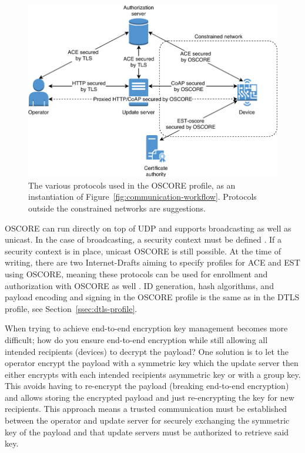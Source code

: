 \documentclass[0-thesis.tex]{subfiles}
\begin{document}
\begin{figure}
    \caption{The various protocols used in the OSCORE profile, as an instantiation of
    Figure~\ref{fig:communication-workflow}. Protocols outside the constrained networks are suggestions.}
    \label{fig:oscore-profile}
    \includegraphics{images/oscore-profile.pdf}
\end{figure}

OSCORE can run directly on top of UDP and supports broadcasting as well as unicast. In the
case of broadcasting, a security context must be defined \parencite{oscore-group}. If a
security context is in place, unicast OSCORE is still possible. At the time of writing,
there are two Internet-Drafts aiming to specify profiles for ACE and EST using OSCORE,
meaning these protocols can be used for enrollment and authorization with OSCORE as well
\parencite{ace-oscore, est-oscore}. ID generation, hash algorithms, and payload encoding
and signing in the OSCORE profile is the same as in the DTLS profile, see
Section~\ref{ssec:dtls-profile}.

When trying to achieve end-to-end encryption key management becomes more difficult; how do
you ensure end-to-end encryption while still allowing all intended recipients (devices) to
decrypt the payload? One solution is to let the operator encrypt the payload with a
symmetric key which the update server then either encrypts with each intended recipients
asymmetric key or with a group key. This avoids having to re-encrypt the payload (breaking
end-to-end encryption) and allows storing the encrypted payload and just re-encrypting the
key for new recipients. This approach means a trusted communication must be established
between the operator and update server for securely exchanging the symmetric key of the
payload and that update servers must be authorized to retrieve said key.
\end{document}
